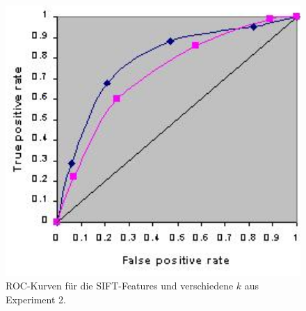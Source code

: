 \begin{figure}
	\centering
	\includegraphics[scale=0.35]{images/roc_ph.png}
	\caption{ROC-Kurven für die SIFT-Features und verschiedene $k$ aus Experiment 2.}
	\label{img:roc5}
\end{figure}


